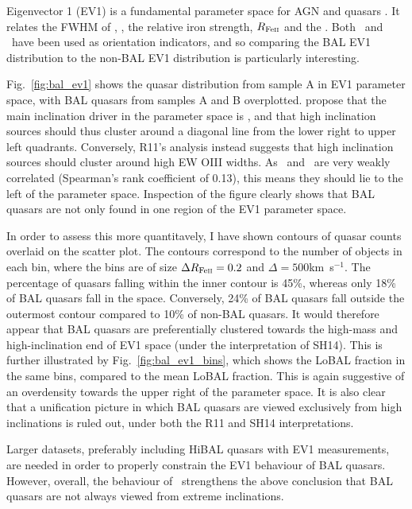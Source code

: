Eigenvector 1 (EV1) is a fundamental parameter space for AGN and quasars
\citep{borosongreen,sulentic2000ev1,marziani2001,shenho2014}. 
It relates the 
FWHM of \hb, \fwh, the relative iron strength, 
$R_{{\rm Fe \textsc{ii}}}$ and
the \ewo. Both \ewo\ and \fwh\ have been used as orientation
indicators, and so comparing the BAL EV1 distribution to the non-BAL EV1 
distribution is particularly interesting. 

Fig.~\ref{fig:bal_ev1} shows the quasar distribution from sample A 
in EV1 parameter space, with BAL quasars from samples A and B overplotted.
\cite[][hereafter SH14]{shenho2014} propose 
that the main inclination driver in the parameter space
is \fwh, and that high inclination sources should thus cluster around
a diagonal line from the lower right to upper left quadrants. Conversely,
R11's analysis instead suggests that high inclination sources should cluster
around high EW OIII widths. As \ewo\ and \fwh\ are very weakly correlated
(Spearman's rank coefficient of 0.13), this means they should lie to
the left of the parameter space. Inspection of the figure clearly 
shows that BAL quasars are not only found in one region of the 
EV1 parameter space. 

In order to assess this more quantitavely, I have shown contours of 
quasar counts overlaid on the scatter plot. The contours correspond
to the number of objects in each bin, where the bins are of size
$\Delta R_{{\rm Fe \textsc{ii}}} = 0.2$ and $\Delta$\fwh$=500$km~s$^{-1}$.
The percentage of quasars falling within the inner contour is 45\%, 
whereas only 18\% of BAL quasars fall in the space. Conversely, 24\% 
of BAL quasars fall outside the outermost contour compared to 10\% of 
non-BAL quasars. It would therefore appear that BAL 
quasars are preferentially clustered towards the high-mass and 
high-inclination end of EV1 space (under the interpretation of SH14).
This is further illustrated by Fig.~\ref{fig:bal_ev1_bins},
which shows the LoBAL fraction in the same bins, compared to the 
mean LoBAL fraction. This is again suggestive of an overdensity 
towards the upper right of the parameter space.
It is also clear that a unification picture in which BAL 
quasars are viewed exclusively from high inclinations is ruled out,
under both the R11 and SH14 interpretations. 

Larger datasets, preferably including HiBAL quasars with EV1 measurements, 
are needed in order to properly constrain the EV1 behaviour of BAL quasars.
However, overall, the behaviour of \fwh\ strengthens the above 
conclusion that BAL quasars are not always viewed from 
extreme inclinations.

